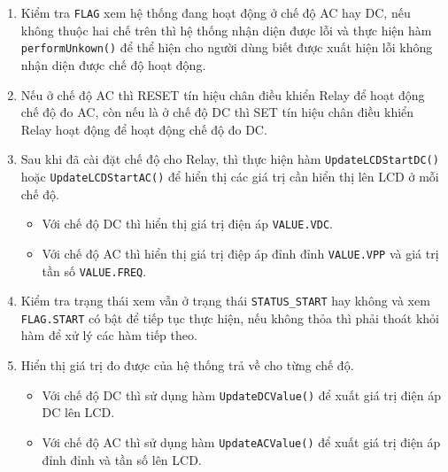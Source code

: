\begin{enumerate}[label = Bước \arabic *:]
	\item Kiểm tra \texttt{FLAG} xem hệ thống đang hoạt động ở chế độ AC hay DC, nếu không thuộc hai chế trên thì hệ thống nhận diện được lỗi và thực hiện hàm \texttt{performUnkown()} để thể hiện cho người dùng biết được xuất hiện lỗi không nhận diện được chế độ hoạt động.
	\item Nếu ở chế độ AC thì RESET tín hiệu chân điều khiển Relay để hoạt động chế độ đo AC, còn nếu là ở chế độ DC thì SET tín hiệu chân điều khiển Relay hoạt động để hoạt động chế độ đo DC.
	\item Sau khi đã cài đặt chế độ cho Relay, thì thực hiện hàm \texttt{UpdateLCDStartDC()} hoặc \texttt{UpdateLCDStartAC()} để hiển thị các giá trị cần hiển thị lên LCD ở mỗi chế độ.
		\begin{itemize}[label=-]
			\item Với chế độ DC thì hiển thị giá trị điện áp \texttt{VALUE.VDC}.
			\item Với chế độ AC thì hiển thị giá trị điệp áp đỉnh đỉnh \texttt{VALUE.VPP} và giá trị tần số \texttt{VALUE.FREQ}.
		\end{itemize}
	\item Kiểm tra trạng thái xem vẫn ở trạng thái \texttt{STATUS\_START} hay không và xem \texttt{FLAG.START} có bật để tiếp tục thực hiện, nếu không thỏa thì phải thoát khỏi hàm để xử lý các hàm tiếp theo.
	\item Hiển thị giá trị đo được của hệ thống trả về cho từng chế độ.
		\begin{itemize}[label = -]
			\item Với chế độ DC thì sử dụng hàm \texttt{UpdateDCValue()} để xuất giá trị điện áp DC lên LCD.
			\item Với chế độ AC thì sử dụng hàm \texttt{UpdateACValue()} để xuất giá trị điện áp đỉnh đỉnh và tần số lên LCD.
		\end{itemize}
\end{enumerate}

